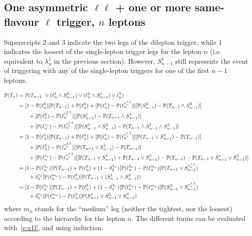 \documentclass{article}
\newcommand{\pro}{\ensuremath{\mathbb{P}}}
\begin{document}
\subsection{One asymmetric $\ell\ell$ + one or more same-flavour $\ell$ trigger, $n$ leptons}

Superscripts $2$ and $3$ indicate the two legs of the dilepton trigger, while $1$ indicates the loosest of the single-lepton trigger legs 
for the lepton $n$ (i.e. equivalent to $\lambda_n^1$ in the previous section). However, $S_{n-1}^1$ still represents the event of triggering with any of the single-lepton triggers for one of the first $n-1$ leptons. 
 
\begin{align}
\pro(T_n) &= \pro(T_{n-1} \
\vee (\ell_n^{1} \wedge S_{n-1}^{2}) \vee (\ell_n^{2} \wedge S_{n-1}^{1}) \vee \ell_n^3) \notag\\
%
&=[1-\pro(\ell_n^3)]\pro(T_{n-1}) + \pro(\ell_n^3)
+ [\pro(\ell_n^{1}) - \pro(\ell_n^{\tau_n^{1,3}})][\pro(S_{n-1}^{2}) - \pro(T_{n-1}\wedge S_{n-1}^2) ]\notag\\
&\qquad + [\pro(\ell_n^{2}) - \pro(\ell_n^{\tau_n^{2,3}})][\pro(S_{n-1}^{1})-\pro(T_{n-1}\wedge S_{n-1}^1)]\notag\\
&\qquad +  [\pro(\ell_n^{\tau_{n}}) - \pro(\ell_n^{\tau_{n}^{1,2}}) ]
[\pro(S_{n-1}^{1}\wedge S_{n-1}^{2}) - \pro(T_{n-1}\wedge S_{n-1}^{1}\wedge S_{n-1}^{2})]\notag\\
%
&=[1-\pro(\ell_n^3)]\pro(T_{n-1}) + \pro(\ell_n^3)
 + [\pro(\ell_n^{1}) - \pro(\ell_n^{\tau_n^{1,3}})][\pro(T_{n-1}\vee  S_{n-1}^2) - \pro(T_{n-1})]\notag\\
&\qquad + [\pro(\ell_n^{2}) - \pro(\ell_n^{\tau_n^{2,3}})][\pro(T_{n-1}\vee  S_{n-1}^1) - \pro(T_{n-1})]\notag\\
&\qquad +  [\pro(\ell_n^{\tau_{n}}) - \pro(\ell_n^{\tau_{n}^{1,2}}) ]
[\pro(T_{n-1} \vee S_{n-1}^{1})+\pro(T_{n-1}\vee S_{n-1}^{2}) 
- \pro(T_{n-1})-\pro(T_{n-1} \vee S_{n-1}^{1} \vee S_{n-1}^{2})]\notag\\
%
&= [1-\pro(\ell_n^{\lambda_n})]\pro(T_{n-1}) + \pro(\ell_n^3)
+ (1-\delta_3^{\lambda_n})[\pro(\ell_n^{\lambda_n}) - \pro(\ell_n^{m_n})]\pro(T_{n-1}\vee  S_{n-1}^{\tau_n^{1,2}})\notag\\
&\qquad +  \delta_3^{\tau_n}[\pro(\ell_n^{m_n}) - \pro(\ell_n^3) ]
\pro(T_{n-1} \vee (S_{n-1}^{1}\wedge S_{n-1}^{2}))\notag\\
%
&= [1-\pro(\ell_n^{\lambda_n})]\pro(T_{n-1}) + \pro(\ell_n^3)
+ (1-\delta_3^{\lambda_n})[\pro(\ell_n^{\lambda_n}) -\pro(\ell_n^{m_n})]\pro(S_{n-1}^3\vee  S_{n-1}^{\tau^{1,2}_n})\notag\\
&\qquad + \delta_3^{\tau_n} [\pro(\ell_n^{m_n}) - \pro(\ell_n^3) ]
\pro(S_{n-1}^1 \vee S_{n-1}^{2}\vee S_{n-1}^{3})
\label{e:2aO1}
\end{align}
where $m_n$ stands for the ``medium'' leg (neither the tightest, nor the loosest) according to the hierarchy for the lepton $n$. 
The different terms can be evaluated with~\ref{e:x1l}, and using induction. 
\end{document}
